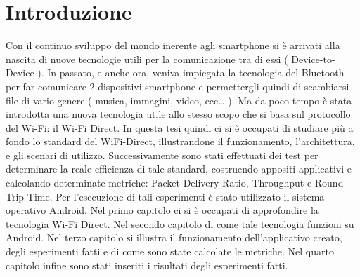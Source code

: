 \chapter*{Introduzione}

Con il continuo sviluppo del mondo inerente agli smartphone si è arrivati alla nascita di nuove tecnologie utili per la comunicazione tra di essi ( Device-to-Device ).
In passato, e anche ora, veniva impiegata la tecnologia del Bluetooth per far comunicare 2 dispositivi smartphone e permettergli quindi di scambiarsi file di vario genere ( musica, immagini, video, ecc… ).
Ma da poco tempo è stata introdotta una nuova tecnologia utile allo stesso scopo che si basa sul protocollo del Wi-Fi: il Wi-Fi Direct.
In questa tesi quindi ci si è occupati di studiare più a fondo lo standard del WiFi-Direct, illustrandone il funzionamento, l’architettura, e gli scenari di utilizzo.
Successivamente sono stati effettuati dei test per determinare la reale efficienza di tale standard, costruendo appositi applicativi e calcolando determinate metriche: Packet Delivery Ratio, Throughput e Round Trip Time.
Per l’esecuzione di tali esperimenti è stato utilizzato il sistema operativo Android.
Nel primo capitolo ci si è occupati di approfondire la tecnologia Wi-Fi Direct.
Nel secondo capitolo di come tale tecnologia funzioni su Android.
Nel terzo capitolo si illustra il funzionamento dell’applicativo creato, degli esperimenti fatti e di come sono state calcolate le metriche.
Nel quarto capitolo infine sono stati inseriti i risultati degli esperimenti fatti.
